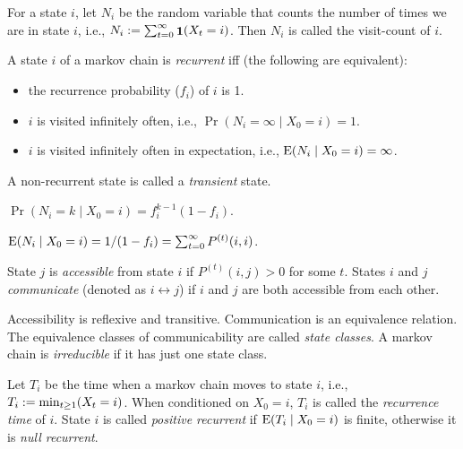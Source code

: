 \documentclass[a4paper, 12pt, fleqn]{article}
\DeclareMathOperator{\boolone}{\mathbf{1}}
\begin{document}
\begin{definition}
For a state $i$, let $N_i$ be the random variable that counts the number of times
we are in state $i$, i.e., $N_i \defeq \sum_{t=0}^{\infty}\boolone(X_t = i)$.
Then $N_i$ is called the visit-count of $i$.
\end{definition}

\begin{definition}
A state $i$ of a markov chain is \emph{recurrent} iff (the following are equivalent):
\begin{itemize}
\item the recurrence probability ($f_i$) of $i$ is 1.
\item $i$ is visited infinitely often, i.e., $\Pr(N_i=\infty \mid X_0 = i) = 1$.
\item $i$ is visited infinitely often in expectation, i.e., $\operatorname*{E}(N_i \mid X_0 = i) = \infty$.
\end{itemize}
A non-recurrent state is called a \emph{transient} state.
\end{definition}

\begin{lemma}
$\Pr(N_i = k \mid X_0 = i) = f_i^{k-1}(1-f_i)$.
\end{lemma}

\begin{lemma}
$\operatorname*{E}(N_i \mid X_0 = i) = 1/(1-f_i) = \sum_{t=0}^{\infty}P^{(t)}(i,i)$.
\end{lemma}

\begin{definition}
State $j$ is \emph{accessible} from state $i$ if $P^{(t)}(i, j) > 0$ for some $t$.
States $i$ and $j$ \emph{communicate} (denoted as $i \leftrightarrow j$)
if $i$ and $j$ are both accessible from each other.
\end{definition}

\begin{lemma}
Accessibility is reflexive and transitive.
Communication is an equivalence relation.
The equivalence classes of communicability are called \emph{state classes}.
A markov chain is \emph{irreducible} if it has just one state class.
\end{lemma}

\begin{definition}
Let $T_i$ be the time when a markov chain moves to state $i$, i.e.,
$T_i := \min_{t \ge 1} (X_t = i)$.
When conditioned on $X_0 = i$, $T_i$ is called the \emph{recurrence time} of $i$.
State $i$ is called \emph{positive recurrent} if $\operatorname*{E}(T_i \mid X_0=i)$ is finite,
otherwise it is \emph{null recurrent}.
\end{definition}
\end{document}
